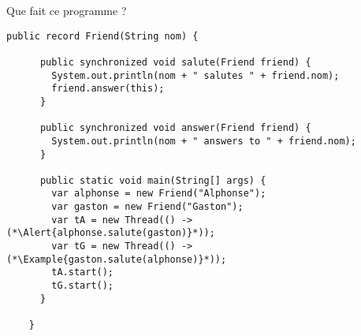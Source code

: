 
\begingroup

\begin{frame}[fragile]{Que fait ce programme ?}

  \begin{lstlisting}[gobble=2]
    public record Friend(String nom) {
      
      public synchronized void salute(Friend friend) {
        System.out.println(nom + " salutes " + friend.nom);
        friend.answer(this);
      }
      
      public synchronized void answer(Friend friend) {
        System.out.println(nom + " answers to " + friend.nom);
      }
      
      public static void main(String[] args) {
        var alphonse = new Friend("Alphonse");
        var gaston = new Friend("Gaston");
        var tA = new Thread(() -> (*\Alert{alphonse.salute(gaston)}*));
        var tG = new Thread(() -> (*\Example{gaston.salute(alphonse)}*));
        tA.start();
        tG.start();
      }
      
    }
  \end{lstlisting}
  

\end{frame}

\endgroup
\endinput
